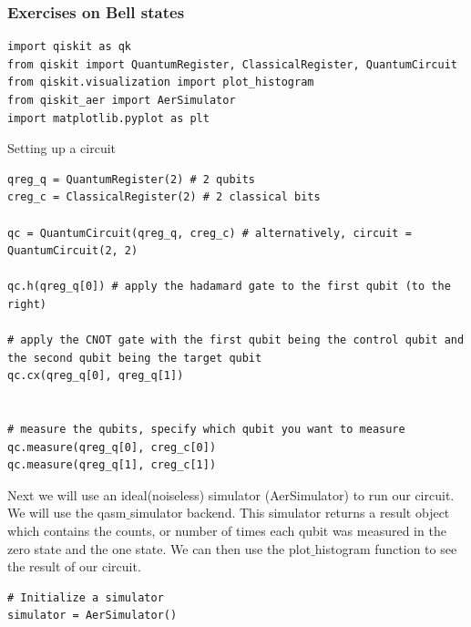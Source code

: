 \documentclass{beamer}
\begin{document}
\begin{frame}
\frametitle{Exercises on Bell states}

\begin{verbatim}
import qiskit as qk
from qiskit import QuantumRegister, ClassicalRegister, QuantumCircuit
from qiskit.visualization import plot_histogram
from qiskit_aer import AerSimulator
import matplotlib.pyplot as plt

\end{verbatim}


Setting up a circuit
















\begin{verbatim}
qreg_q = QuantumRegister(2) # 2 qubits
creg_c = ClassicalRegister(2) # 2 classical bits

qc = QuantumCircuit(qreg_q, creg_c) # alternatively, circuit = QuantumCircuit(2, 2)

qc.h(qreg_q[0]) # apply the hadamard gate to the first qubit (to the right)

# apply the CNOT gate with the first qubit being the control qubit and the second qubit being the target qubit
qc.cx(qreg_q[0], qreg_q[1]) 


# measure the qubits, specify which qubit you want to measure
qc.measure(qreg_q[0], creg_c[0])
qc.measure(qreg_q[1], creg_c[1])

\end{verbatim}


Next we will use an ideal(noiseless) simulator (AerSimulator) to run
our circuit. We will use the qasm$\_$simulator backend. This simulator
returns a result object which contains the counts, or number of times
each qubit was measured in the zero state and the one state. We can
then use the plot$\_$histogram function to see the result of our circuit.








\begin{verbatim}
# Initialize a simulator
simulator = AerSimulator()


\end{verbatim}
\end{frame}
\end{document}
